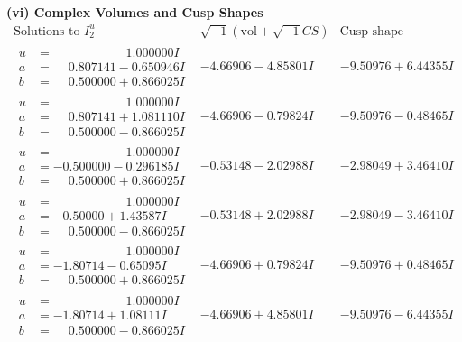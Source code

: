 \documentclass[1p]{elsarticle_modified}
\theoremstyle{definition}
\newcommand{\I}{\sqrt{-1}}
\begin{document}
\newpage\flushleft \textbf{(vi) Complex Volumes and Cusp Shapes}
$$\begin{array}{c|c|c}  
\text{Solutions to }I^u_{2}& \I (\text{vol} + \sqrt{-1}CS) & \text{Cusp shape}\\
 \hline 
\begin{aligned}
u &= \phantom{-0.000000 -}1.000000 I \\
a &= \phantom{-}0.807141 - 0.650946 I \\
b &= \phantom{-}0.500000 + 0.866025 I\end{aligned}
 & -4.66906 - 4.85801 I & -9.50976 + 6.44355 I \\ \hline\begin{aligned}
u &= \phantom{-0.000000 -}1.000000 I \\
a &= \phantom{-}0.807141 + 1.081110 I \\
b &= \phantom{-}0.500000 - 0.866025 I\end{aligned}
 & -4.66906 - 0.79824 I & -9.50976 - 0.48465 I \\ \hline\begin{aligned}
u &= \phantom{-0.000000 -}1.000000 I \\
a &= -0.500000 - 0.296185 I \\
b &= \phantom{-}0.500000 + 0.866025 I\end{aligned}
 & -0.53148 - 2.02988 I & -2.98049 + 3.46410 I \\ \hline\begin{aligned}
u &= \phantom{-0.000000 -}1.000000 I \\
a &= -0.50000 + 1.43587 I \\
b &= \phantom{-}0.500000 - 0.866025 I\end{aligned}
 & -0.53148 + 2.02988 I & -2.98049 - 3.46410 I \\ \hline\begin{aligned}
u &= \phantom{-0.000000 -}1.000000 I \\
a &= -1.80714 - 0.65095 I \\
b &= \phantom{-}0.500000 + 0.866025 I\end{aligned}
 & -4.66906 + 0.79824 I & -9.50976 + 0.48465 I \\ \hline\begin{aligned}
u &= \phantom{-0.000000 -}1.000000 I \\
a &= -1.80714 + 1.08111 I \\
b &= \phantom{-}0.500000 - 0.866025 I\end{aligned}
 & -4.66906 + 4.85801 I & -9.50976 - 6.44355 I \\ \hline\begin{aligned}

\end{aligned}
\end{array}$$
\end{document}

